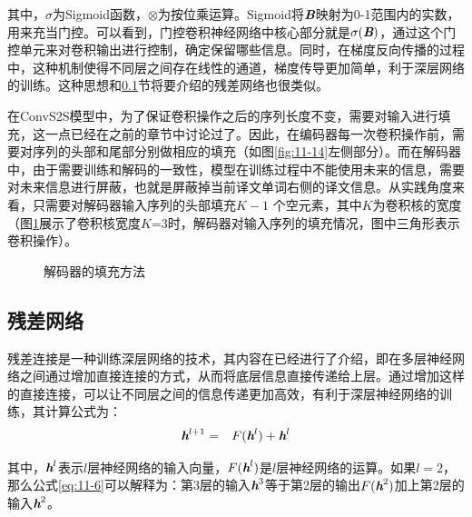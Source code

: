 \noindent 其中，$\sigma$为Sigmoid函数，$\otimes$为按位乘运算。Sigmoid将$\textbf{\em B}$映射为0-1范围内的实数，用来充当门控。可以看到，门控卷积神经网络中核心部分就是$\sigma ( \textbf{\em B} )$，通过这个门控单元来对卷积输出进行控制，确定保留哪些信息。同时，在梯度反向传播的过程中，这种机制使得不同层之间存在线性的通道，梯度传导更加简单，利于深层网络的训练。这种思想和\ref{sec:11.2.3}节将要介绍的残差网络也很类似。

\parinterval 在ConvS2S模型中，为了保证卷积操作之后的序列长度不变，需要对输入进行填充，这一点已经在之前的章节中讨论过了。因此，在编码器每一次卷积操作前，需要对序列的头部和尾部分别做相应的填充（如图\ref{fig:11-14}左侧部分）。而在解码器中，由于需要训练和解码的一致性，模型在训练过程中不能使用未来的信息，需要对未来信息进行屏蔽，也就是屏蔽掉当前译文单词右侧的译文信息。从实践角度来看，只需要对解码器输入序列的头部填充$K-1$ 个空元素，其中$K$为卷积核的宽度（图\ref{fig:11-15}展示了卷积核宽度$K$=3时，解码器对输入序列的填充情况，图中三角形表示卷积操作）。

\begin{figure}[htp]
\centering

\caption{解码器的填充方法}
\label{fig:11-15}
\end{figure}


\subsection{残差网络}
\label{sec:11.2.3}

\parinterval 残差连接是一种训练深层网络的技术，其内容在{\chapternine}已经进行了介绍，即在多层神经网络之间通过增加直接连接的方式，从而将底层信息直接传递给上层。通过增加这样的直接连接，可以让不同层之间的信息传递更加高效，有利于深层神经网络的训练，其计算公式为：
\begin{eqnarray}
\textbf{\em h}^{l+1} &=& F (\textbf{\em h}^l) + \textbf{\em h}^l
\label{eq:11-6}
\end{eqnarray}

\noindent 其中，$\textbf{\em h}^l$表示$l$层神经网络的输入向量，${F} (\textbf{\em h}^l)$是$l$层神经网络的运算。如果$l=2$，那么公式\eqref{eq:11-6}可以解释为：第3层的输入$\textbf{\em h}^3$等于第2层的输出${F}(\textbf{\em h}^2)$加上第2层的输入$\textbf{\em h}^2$。

